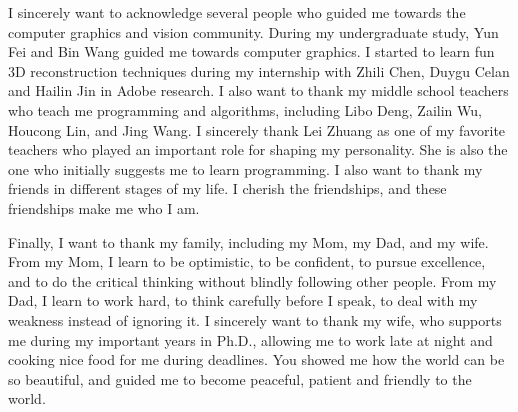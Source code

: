 I sincerely want to acknowledge several people who guided me towards the computer graphics and vision community. During my undergraduate study, Yun Fei and Bin Wang guided me towards computer graphics. I started to learn fun 3D reconstruction techniques during my internship with Zhili Chen, Duygu Celan and Hailin Jin in Adobe research.
%
I also want to thank my middle school teachers who teach me programming and algorithms, including Libo Deng, Zailin Wu, Houcong Lin, and Jing Wang.
I sincerely thank Lei Zhuang as one of my favorite teachers who played an important role for shaping my personality. She is also the one who initially suggests me to learn programming.
I also want to thank my friends in different stages of my life. I cherish the friendships, and these friendships make me who I am.

Finally, I want to thank my family, including my Mom, my Dad, and my wife. From my Mom, I learn to be optimistic, to be confident, to pursue excellence, and to do the critical thinking without blindly following other people.
From my Dad, I learn to work hard, to think carefully before I speak, to deal with my weakness instead of ignoring it.
I sincerely want to thank my wife, who supports me during my important years in Ph.D., allowing me to work late at night and cooking nice food for me during deadlines. You showed me how the world can be so beautiful, and guided me to become peaceful, patient and friendly to the world.
